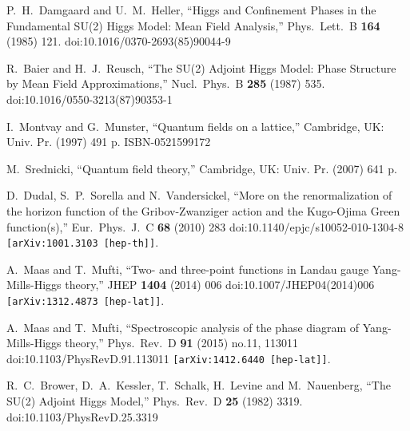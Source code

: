 \documentclass[a4paper,11pt,british,twosides]{book}%
\numberwithin{equation}{section}
\begin{document}
\begin{thebibliography}{9}
  P.~H.~Damgaard and U.~M.~Heller,
  ``Higgs and Confinement Phases in the Fundamental SU(2) Higgs Model: Mean Field Analysis,''
  Phys.\ Lett.\ B {\bf 164} (1985) 121.
  doi:10.1016/0370-2693(85)90044-9

  R.~Baier and H.~J.~Reusch,
  ``The SU(2) Adjoint Higgs Model: Phase Structure by Mean Field Approximations,''
  Nucl.\ Phys.\ B {\bf 285} (1987) 535.
  doi:10.1016/0550-3213(87)90353-1
 
  I.~Montvay and G.~Munster,
  ``Quantum fields on a lattice,''
  Cambridge, UK: Univ. Pr. (1997) 491 p.
  ISBN-0521599172

  M.~Srednicki,
  ``Quantum field theory,''
  Cambridge, UK: Univ. Pr. (2007) 641 p.

  D.~Dudal, S.~P.~Sorella and N.~Vandersickel,
  ``More on the renormalization of the horizon function of the Gribov-Zwanziger action and the
  Kugo-Ojima Green function(s),''
  Eur.\ Phys.\ J.\ C {\bf 68} (2010) 283
  doi:10.1140/epjc/s10052-010-1304-8
  {\tt [arXiv:1001.3103 [hep-th]]}.

  A.~Maas and T.~Mufti,
  ``Two- and three-point functions in Landau gauge Yang-Mills-Higgs theory,''
  JHEP {\bf 1404} (2014) 006
  doi:10.1007/JHEP04(2014)006
  {\tt[arXiv:1312.4873 [hep-lat]]}.

  A.~Maas and T.~Mufti,
  ``Spectroscopic analysis of the phase diagram of Yang-Mills-Higgs theory,''
  Phys.\ Rev.\ D {\bf 91} (2015) no.11,  113011
  doi:10.1103/PhysRevD.91.113011
  {\tt [arXiv:1412.6440 [hep-lat]]}.

  R.~C.~Brower, D.~A.~Kessler, T.~Schalk, H.~Levine and M.~Nauenberg,
  ``The SU(2) Adjoint Higgs Model,''
  Phys.\ Rev.\ D {\bf 25} (1982) 3319.
  doi:10.1103/PhysRevD.25.3319




\end{thebibliography}
\end{document}
